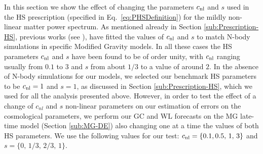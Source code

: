In this section we show the effect of changing the parameters $c_{\mathrm{nl}}$
and $s$ used in the HS prescription (specified in Eq.\ \ref{eq:PHSDefinition})
for the mildly non-linear matter power spectrum. As mentioned already
in Section \ref{sub:Prescription-HS}, previous works (see
\cite{zhao_modeling_2014,zhao_n-body_2011,koyama_non-linear_2009}),
have fitted the values of $c_{\mathrm{nl}}$ and $s$ to match N-body simulations
in specific Modified Gravity models. In all these cases the HS parameters
$c_{\mathrm{nl}}$ and $s$ have been found to be of order unity, with $c_{\mathrm{nl}}$
ranging usually from $0.1$ to $3$ and $s$ from about $1/3$ to
a value of around $2$. In the absence of N-body simulations for our
models, we selected our benchmark HS parameters
to be $c_{\mathrm{nl}}=1$ and $s=1$, as discussed in Section \ref{sub:Prescription-HS}, which we used
for all the analysis presented above. However, in order to test
the effect of a change of $c_{nl}$ and $s$ non-linear parameters on our estimation of errors
on the cosmological parameters, we perform our GC and WL forecasts on the
MG late-time model (Section \ref{sub:MG-DE}) also changing one at
a time the values of both HS parameters. We use the following values
for our test: $c_{\mathrm{nl}}=\{0.1,0.5,\,1,\,3\}$ and $s=\{0,\,1/3,\,2/3,\,1\}$.

